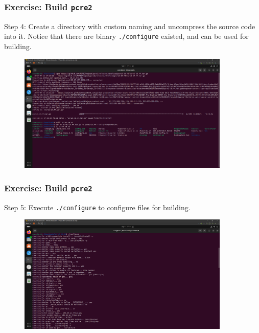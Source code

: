 \begin{frame}
    \frametitle{Exercise: Build \texttt{pcre2}}

    Step 4: Create a directory with custom naming and uncompress the source code into it. Notice that there are binary \alert{\texttt{./configure}} existed, and can be used for building.

    \begin{figure}[H]
        \centering
        \includegraphics[width=0.9\textwidth]{../figure/pcre2_build_4.png}
    \end{figure}

\end{frame}

\begin{frame}
    \frametitle{Exercise: Build \texttt{pcre2}}

    Step 5: Execute \texttt{./configure} to configure files for building.

    \begin{figure}[H]
        \centering
        \includegraphics[width=0.9\textwidth]{../figure/pcre2_build_5.png}
    \end{figure}

\end{frame}

